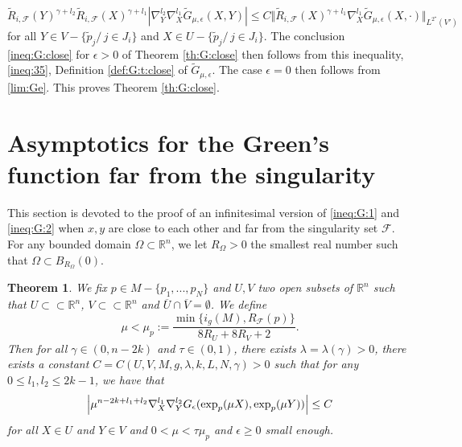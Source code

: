 \documentclass[reqno]{amsart}
\newtheorem{theorem}{Theorem}[section]
\def \rn {\mathbb{R}^n}
\def \eps {\epsilon}
\def \crit {2^\star}
\def \F {{\mathcal F}}
\begin{document}
\begin{equation*}
\tilde{R}_{i,\F}(Y)^{\gamma+l_2} \tilde{R}_{i,\F}(X)^{\gamma+l_1} |\nabla_{Y}^{l_2}\nabla_{X}^{l_1}\tilde{G}_{\mu,\eps}(X,Y)|\leq C\Vert \tilde{R}_{i,\F}(X)^{\gamma+l_1} \nabla_X^{l_1}\tilde{G}_{\mu,\eps}(X,\cdot)\Vert_{L^{\crit}(V')}
\end{equation*}
for all $Y\in V-\{\tilde{p}_j/\, j\in J_i\}$ and $X\in U-\{\tilde{p}_j/\, j\in J_i\}$. The conclusion \eqref{ineq:G:close} for $\eps>0$ of Theorem \ref{th:G:close} then follows from this inequality, \eqref{ineq:35}, Definition \eqref{def:G:t:close} of $\tilde{G}_{\mu,\eps}$. The case $\eps=0$ then follows from \eqref{lim:Ge}. This proves Theorem \ref{th:G:close}.

\section{Asymptotics for the Green's function far from the singularity}\label{sec:green3}
This section is devoted to the proof of an infinitesimal version of \eqref{ineq:G:1} and \eqref{ineq:G:2} when $x,y$ are close to each other and far from the singularity set  $\F$. For any bounded domain $\Omega\subset \rn$, we let $R_\Omega>0$ the smallest real number such that $\Omega\subset B_{R_\Omega}(0)$.

\begin{theorem}\label{th:G:far} We fix $p\in M-\{p_1,...,p_N\}$ and $U,V$ two open subsets of $\rn$ such that $U\subset\subset \rn$, $V\subset\subset \rn$ and $\overline{U}\cap\overline{V}=\emptyset$. We define
\begin{equation}\label{hyp:alpha}
\mu<\mu_p:=\frac{\min\{i_g(M),R_{\F}(p)\}}{8R_U+8R_V+2}.
\end{equation}
Then for all $\gamma\in (0,n-2k)$ and $\tau\in (0,1)$, there exists $\lambda=\lambda(\gamma)>0$, there exists a constant $C=C(U,V, M,g,\lambda, k, L,N,\gamma)>0$ such that for any $0\leq l_1,l_2\leq 2k-1$, we have that
\begin{equation}\label{ineq:G:far}
\left|  \mu^{n-2k+l_1+l_2}\nabla_X^{l_1}\nabla_Y^{l_2}G_\eps(\hbox{exp}_{p}(\mu X),\hbox{exp}_{p}(\mu Y) )\right|\leq C
\end{equation}
for all $X\in U $ and $Y\in V$ and $0<\mu<\tau\mu_p$ and $\eps\geq 0$ small enough.
\end{theorem}
\end{document}
